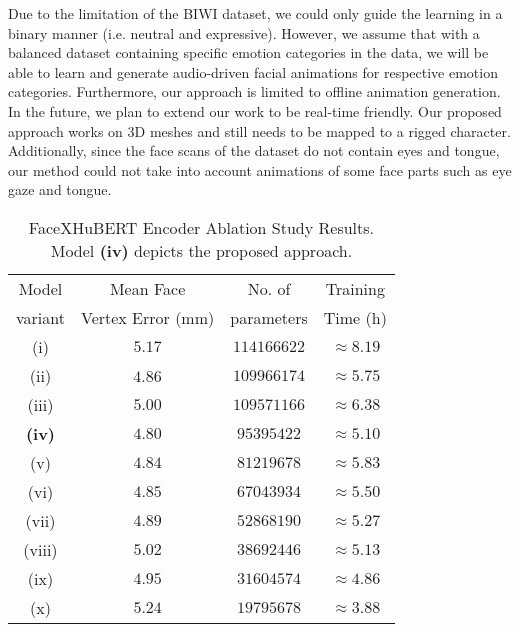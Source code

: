 \documentclass[10pt,twocolumn,letterpaper]{article}
\begin{document}
Due to the limitation of the BIWI dataset, we could only guide the learning in a binary manner (i.e. neutral and expressive). However, we assume that with a balanced dataset containing specific emotion categories in the data, we will be able to learn and generate audio-driven facial animations for respective emotion categories. Furthermore, our approach is limited to offline animation generation. In the future, we plan to extend our work to be real-time friendly. Our proposed approach works on 3D meshes and still needs to be mapped to a rigged character. Additionally, since the face scans of the dataset do not contain eyes and tongue, our method could not take into account animations of some face parts such as eye gaze and tongue. 
\begingroup
\setlength{\tabcolsep}{5pt} \renewcommand{\arraystretch}{0.6} \begin{table}[t]
  \centering
  \begin{tabular}{c c c c}
    \toprule
    Model & Mean Face & No. of  & Training\\
    variant & Vertex Error (mm) & parameters & Time (h)\\
    \midrule
    (i) & $5.17$ & $114166622$ & $\approx8.19$\\
    (ii) & $4.8$6 & $109966174$ & $\approx5.75$\\
    (iii) & $5.00$ & $109571166$ & $\approx6.38$\\
    \textbf{(iv)} & $4.80$ & $95395422$ & $\approx5.10$\\
    (v) & $4.84$ & $81219678$ & $\approx5.83$\\
    (vi) & $4.85$ & $67043934$ & $\approx5.50$\\
    (vii) & $4.89$ & $52868190$ & $\approx5.27$\\
    (viii) & $5.02$ & $38692446$ & $\approx5.13$\\
    (ix) & $4.95$ & $31604574$ & $\approx4.86$\\
    (x) & $5.24$ & $19795678$ & $\approx3.88$\\
    \bottomrule
\end{tabular}
  \caption{FaceXHuBERT Encoder Ablation Study Results. Model \textbf{(iv)} depicts the proposed approach.}
  \label{tab:Hubert_ablation}
\end{table}
\endgroup
\end{document}
